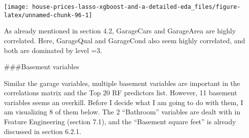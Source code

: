 \documentclass[]{article}
\begin{document}
\texttt{[image: house-prices-lasso-xgboost-and-a-detailed-eda\_files/figure-latex/unnamed-chunk-96-1]}

As already mentioned in section 4.2, GarageCars and GarageArea are
highly correlated. Here, GarageQual and GarageCond also seem highly
correlated, and both are dominated by level =3.

\#\#\#Basement variables

Similar the garage variables, multiple basement variables are important
in the correlations matrix and the Top 20 RF predictors list. However,
11 basement variables seems an overkill. Before I decide what I am going
to do with them, I am visualizing 8 of them below. The 2 ``Bathroom''
variables are dealt with in Feature Engineering (section 7.1), and the
``Basement square feet'' is already discussed in section 6.2.1.
\end{document}
